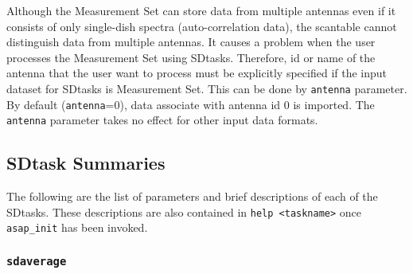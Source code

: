 Although the Measurement Set can store data from multiple antennas
even if it consists of only single-dish spectra (auto-correlation data),
the scantable cannot distinguish data from multiple antennas. It causes
a problem when the user processes the Measurement Set using SDtasks.
Therefore, id or name of the antenna that the user want to process
must be explicitly specified if the input dataset for SDtasks is
Measurement Set. This can be done by {\tt antenna} parameter. By default
({\tt antenna}=0), data associate with antenna id 0 is imported.
The {\tt antenna} parameter takes no effect for other input data formats.


\subsection{SDtask Summaries}
\label{section:sd.sdtasks.tasks}

The following are the list of parameters and
brief descriptions of each of the SDtasks.
These descriptions are also contained in {\tt help <taskname>} once {\tt asap\_init} has been invoked.

\subsubsection{{\tt sdaverage}}
\label{section:sd.sdtasks.tasks.sdaverage}

